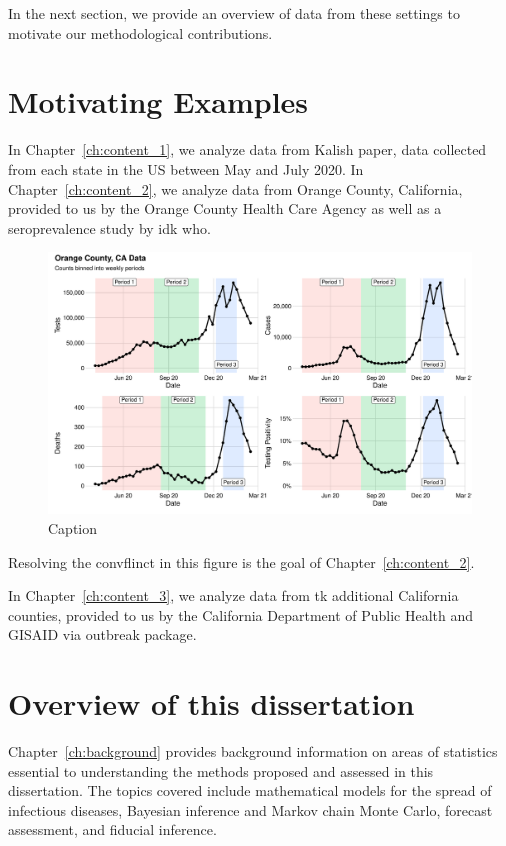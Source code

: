 In the next section, we provide an overview of data from these settings to motivate our methodological contributions.

\section{Motivating Examples}
\label{sec:motivating_examples}

In Chapter~\ref{ch:content_1}, we analyze data from Kalish paper, data collected from each state in the US between May and July 2020.
In Chapter~\ref{ch:content_2}, we analyze data from Orange County, California, provided to us by the Orange County Health Care Agency as well as a seroprevalence study by idk who.

\begin{figure}
    \centering
    \includegraphics[width=1.0\columnwidth]{binned_data_plot}
    \caption{Caption}
    \label{ch_1:fig:binned_data_plot}
\end{figure}

Resolving the convflinct in this figure is the goal of Chapter~\ref{ch:content_2}.

In Chapter~\ref{ch:content_3}, we analyze data from tk additional California counties, provided to us by the California Department of Public Health and GISAID via outbreak package.

\section{Overview of this dissertation}
Chapter~\ref{ch:background} provides background information on areas of statistics essential to understanding the methods proposed and assessed in this dissertation.
The topics covered include mathematical models for the spread of infectious diseases, Bayesian inference and Markov chain Monte Carlo, forecast assessment, and fiducial inference.

